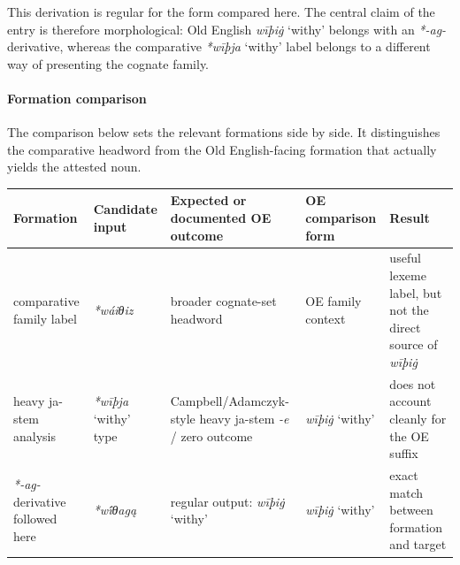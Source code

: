 \documentclass[
  british,
  a4paper,
]{article}
\newcounter{none} %
\providecommand{\Recon}[1]{\emph{*#1}}
\begin{document}
This derivation is regular for the form compared here. The central claim
of the entry is therefore morphological: Old English \emph{wīþiġ}
`withy' belongs with an \emph{*-ag-} derivative, whereas the comparative
\Recon{wīþja} `withy' label belongs to a different way of presenting the
cognate family.

\paragraph{Formation comparison}\label{formation-comparison-7}

The comparison below sets the relevant formations side by side. It
distinguishes the comparative headword from the Old English-facing
formation that actually yields the attested noun.

{\def\LTcaptype{none} %
\begin{longtable}[]{@{}
  >{\raggedright\arraybackslash}p{}
  >{\raggedright\arraybackslash}p{}
  >{\raggedright\arraybackslash}p{}
  >{\raggedright\arraybackslash}p{}
  >{\raggedright\arraybackslash}p{}@{}}
\toprule\noalign{}
\begin{minipage}[b]{\linewidth}\raggedright
Formation
\end{minipage} & \begin{minipage}[b]{\linewidth}\raggedright
Candidate input
\end{minipage} & \begin{minipage}[b]{\linewidth}\raggedright
Expected or documented OE outcome
\end{minipage} & \begin{minipage}[b]{\linewidth}\raggedright
OE comparison form
\end{minipage} & \begin{minipage}[b]{\linewidth}\raggedright
Result
\end{minipage} \\
\midrule\noalign{}
\endhead
\bottomrule\noalign{}
\endlastfoot
comparative family label & {\emph{*wáiθiz}} & broader cognate-set
headword & OE family context & useful lexeme label, but not the direct
source of \emph{wīþiġ} \\
heavy ja-stem analysis & \Recon{wīþja} `withy' type &
Campbell/Adamczyk-style heavy ja-stem \emph{-e} / zero outcome &
{\emph{wīþiġ}} `withy' & does not account cleanly for the OE suffix \\
\emph{*-ag-} derivative followed here & {\emph{*wī́θagą}} & regular
output: {\emph{wīþiġ}} `withy' & {\emph{wīþiġ}} `withy' & exact match
between formation and target \\
\end{longtable}
}
\end{document}
